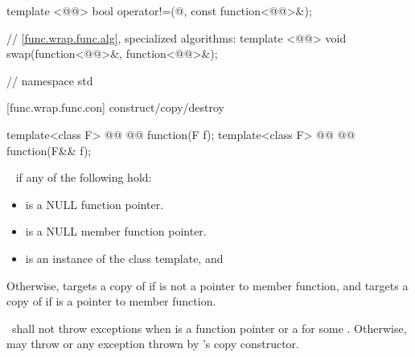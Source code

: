 \documentclass[american,twoside]{book}
\begin{document}
\begin{codeblock}
{  template <@@>
    bool operator!=(@\unspecnull@, const function<@@>&);

  // \ref{func.wrap.func.alg}, specialized algorithms:
  template <@@>
    void swap(function<@@>&, function<@@>&);
} // namespace std
\end{codeblock}

[func.wrap.func.con]{ construct/copy/destroy}
\setcounter{Paras}{7}
\begin{itemdecl}
template<class F> 
  @@ 
           @@
  function(F f);
template<class F> 
  @@ 
           @@
  function(F&& f);
\end{itemdecl}

\begin{itemdescr}
\pnum{}

\pnum\postconditions\  if any of the following hold:
\begin{itemize}
\item{ is a NULL function pointer.}
\item{ is a NULL member function pointer.}
\item{ is an instance of the  class template, and
  }
\end{itemize}

\pnum
Otherwise,  targets a copy of 
 if  is
not a pointer to member function, and targets a copy
of  if  is a pointer to member function.

\pnum\throws\ shall not throw exceptions when  is a function pointer 
or a  for some . Otherwise,
may throw  or any exception thrown by 's copy
 constructor.
\end{itemdescr}
\end{document}

